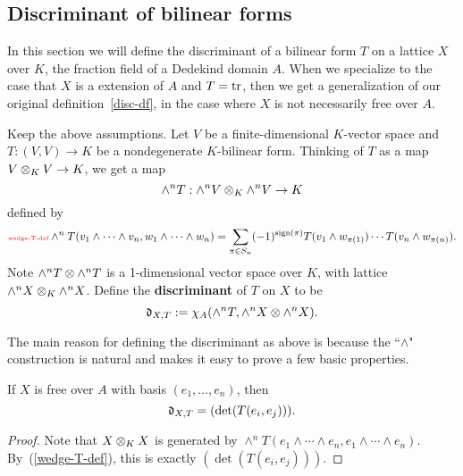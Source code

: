 \subsection{Discriminant of bilinear forms}
In this section we will define the discriminant of a bilinear form $T$ on a lattice $X$ over $K$, the fraction field of a Dedekind domain $A$. When we specialize to the case that $X$ is a extension of $A$ and $T=\operatorname{tr}$, then we get a generalization of our original definition~\ref{disc-df}, in the case where $X$ is not necessarily free over $A$.
\begin{df}
Keep the above assumptions. 
Let $V$ be a finite-dimensional $K$-vector space and $T:(V,V)\to K$ be a nondegenerate $K$-bilinear form. Thinking of $T$ as a map $V\otimes_K V\to K$, 
we get a map
\[
\wedge^nT:\wedge^nV\otimes_K \wedge^n V\to K
\]
defined by 
\begin{equation}\llabel{wedge-T-def}
\wedge^n T(v_1\wedge\cdots \wedge v_n, w_1\wedge \cdots \wedge w_n)=\sum_{\pi\in S_n}(-1)^{\sign(\pi)} T(v_1\wedge w_{\pi(1)})\cdots T(v_n\wedge w_{\pi(n)}).
\end{equation} 
Note $\wedge^n T\otimes\wedge^n T$ is a 1-dimensional vector space over $K$, with lattice $\wedge^n X\otimes_K\wedge^n X$.
Define the \textbf{discriminant} of $T$ on $X$ to be 
\[\mathfrak d_{X,T}:=\chi_A(\wedge^nT,\wedge^nX\otimes \wedge^nX).\]
\end{df}
The main reason for defining the discriminant as above is because the ``$\wedge$" construction is natural and makes it easy to prove a few basic properties. 
\begin{pr}
If $X$ is free over $A$ with basis $(e_1,\ldots, e_n)$, then%
\[\mathfrak d_{X,T}=(\det(T(e_i, e_j))).\]
\end{pr}
\begin{proof}
Note that $X\otimes_K X$ is generated by $\wedge^n T(e_1\wedge \cdots \wedge e_n, e_1\wedge \cdots \wedge e_n)$. By~(\ref{wedge-T-def}), this is exactly $(\det(T(e_i, e_j)))$.
\end{proof}

